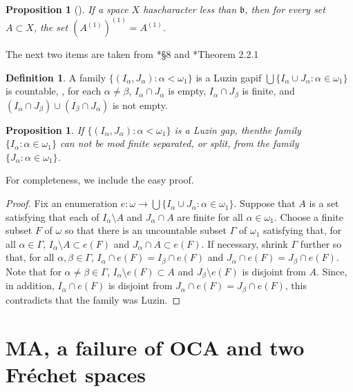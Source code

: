 \documentclass{amsart}
\newtheorem{proposition}[thm]{Proposition}
\theoremstyle{definition}
\newtheorem{definition}[thm]{Definition}
\theoremstyle{remark}
\begin{document}
\begin{proposition}[\cite{Dow2014}] If a space $X$ has\label{frechet} character less
than $\mathfrak b$, then for every set $A\subset X$,
  the set $(A^{(1)})^{(1)} = A^{(1)}$.
\end{proposition}

The next two items are taken from \cite{StevoPPT}*{\S 8}
and \cite{Farah2000}*{Theorem 2.2.1}

\begin{definition} A family 
 $\{ (I_\alpha,J_\alpha) : \alpha<\omega_1\}$  
 is a Luzin gap\label{luzin} 
 if  $\bigcup\{ I_\alpha\cup J_\alpha : \alpha\in\omega_1\}$ is countable,
 , for each $\alpha\neq \beta$, $I_\alpha\cap J_\alpha$ is empty,
 $I_\alpha\cap J_\beta$ is finite, and
  $(I_\alpha\cap J_\beta)\cup (I_\beta\cap J_\alpha)$ is not empty.
\end{definition}
 

\begin{proposition}  If $\{ (I_\alpha,J_\alpha) : \alpha<\omega_1\}$ is a Luzin gap,
then\label{nosplit} the family $\{ I_\alpha : \alpha\in\omega_1\}$ can not be mod
finite separated, or \textit{split}, from the family 
 $\{ J_\alpha : \alpha\in\omega_1\}$. 
\end{proposition}

For completeness, we include   the easy proof.

\begin{proof}  Fix an enumeration $e:\omega\rightarrow 
\bigcup\{ I_\alpha\cup J_\alpha : \alpha\in\omega_1\}$.
Suppose that  $A$ is   a set satisfying
that each of  $I_\alpha\setminus A$ and
 $J_\alpha\cap A$ are  finite  
for all $\alpha\in\omega_1$.
Choose a finite subset $F$ of $\omega$ so that there is an 
uncountable subset $\Gamma$ of $\omega_1$ satisfying that,
for all $\alpha\in \Gamma$, 
 $I_\alpha\setminus A\subset e(F)$ 
 and $J_\alpha\cap A\subset e(F)$.
If necessary, shrink $\Gamma$ further so that, 
 for all $\alpha,\beta\in \Gamma$,
 $I_\alpha\cap e(F)=I_\beta\cap e(F)$ and
  $J_\alpha\cap e(F) = J_\beta\cap e(F)$. 
  Note that for $\alpha\neq\beta\in \Gamma$, 
   $I_\alpha \setminus e(F)\subset A$
   and $J_\beta \setminus e(F)$ is disjoint from $A$.
   Since, in addition, $I_\alpha\cap e(F)$ is disjoint
   from $J_\alpha \cap e(F) = J_\beta\cap e(F)$, 
   this contradicts that the family was Luzin.
\end{proof}

\section{MA, a failure of OCA and two Fr\'echet spaces}
\end{document}
